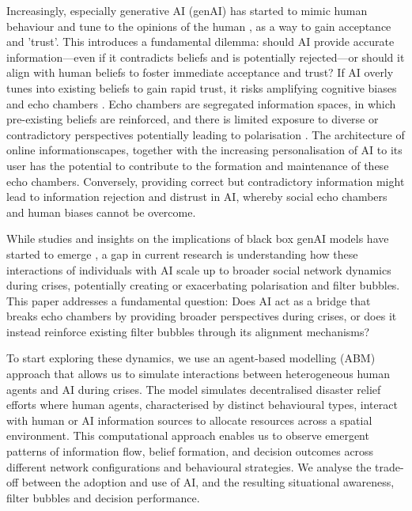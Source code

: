 \documentclass[pdflatex,sn-apa]{sn-jnl}%
\begin{document}
Increasingly, especially generative AI (genAI) has started to mimic human behaviour and tune to the opinions of the human \citep{sharma2024generative}, as a way to gain acceptance and 'trust'. This introduces a fundamental dilemma: should AI provide accurate information—even if it contradicts beliefs and is potentially rejected—or should it align with human beliefs to foster immediate acceptance and trust? If AI overly tunes into existing beliefs to gain rapid trust, it risks amplifying cognitive biases and echo chambers \citep{ekstrom2022self}. Echo chambers are segregated information spaces, in which pre-existing beliefs are reinforced, and there is limited exposure to diverse or contradictory perspectives potentially leading to polarisation \citep{jeon2024hearhere}. The architecture of online informationscapes, together with the increasing personalisation of AI to its user has the potential to contribute to the formation and maintenance of these echo chambers. Conversely, providing correct but contradictory information might lead to information rejection and distrust in AI, whereby social echo chambers and human biases cannot be overcome.

While studies and insights on the implications of black box genAI models have started to emerge \citep{zhang2024see, sharma2024generative}, a gap in current research is understanding how these interactions of individuals with AI scale up to broader social network dynamics during crises, potentially creating or exacerbating polarisation and filter bubbles. This paper addresses a fundamental question: Does AI act as a bridge that breaks echo chambers by providing broader perspectives during crises, or does it instead reinforce existing filter bubbles through its alignment mechanisms?

To start exploring these dynamics, we use an agent-based modelling (ABM) approach that allows us to simulate interactions between heterogeneous human agents and AI during crises. The model simulates decentralised disaster relief efforts where human agents, characterised by distinct behavioural types, interact with human or AI information sources to allocate resources across a spatial environment. This computational approach enables us to observe emergent patterns of information flow, belief formation, and decision outcomes across different network configurations and behavioural strategies. We analyse the trade-off between the adoption and use of AI, and the resulting situational awareness, filter bubbles and decision performance. 
\end{document}
